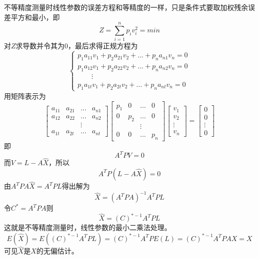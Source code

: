 \begin{enumerate}
	\qquad 不等精度测量时线性参数的误差方程和等精度的一样，只是条件式要取加权残余误差平方和最小，即\begin{equation} Z=\sum_{i=1}^{n}p_iv_i^2=min \end{equation}
	对$ Z $求导数并令其为0，最后求得正规方程为\begin{equation} \begin{cases}
		p_1a_{11}v_1+p_2a_{21}v_2+...+p_na_{n1}v_n=0\\
		p_1a_{12}v_1+p_2a_{22}v_2+...+p_na_{n2}v_n=0\\
		\qquad \vdots\\
		p_1a_{1t}v_1+p_2a_{2t}v_2+...+p_na_{nt}v_n=0
	\end{cases} \end{equation}
	用矩阵表示为\begin{equation} \begin{bmatrix}
		a_{11}&a_{21}&\dots&a_{n1}\\
		a_{12}&a_{22}&\dots&a_{n2}\\
		& 	 &\vdots\\
		a_{1t}&a_{2t}&\dots&a_{nt}
	\end{bmatrix}\begin{bmatrix}
		p_1	&	0	&	\dots&	0\\
		0	&	p_2	&	\dots&	0\\
		& 	 &\vdots\\
		0	&	0	&	\dots&	p_n
	\end{bmatrix}\begin{bmatrix}
		v_1\\v_2\\\vdots\\v_n
	\end{bmatrix}=\begin{bmatrix}
		0\\0\\\vdots\\0
	\end{bmatrix} \end{equation}
	即\begin{equation} A^TPV=0 \end{equation}
	而$ V=L-A\hat{X} $，所以\begin{equation} A^TP(L-A\hat{X})=0 \end{equation}
	由$ A^TPA\hat{X}=A^TPL $得出解为\begin{equation} \hat{X}=(A^TPA)^{-1}A^TPL \end{equation}
	令$ C^*=A^TPA $则\begin{equation} \hat{X}=(C)^{*-1}A^TPL \end{equation}
	这就是不等精度测量时，线性参数的最小二乘法处理。
	\begin{equation} E(\hat{X})=E((C)^{*-1}A^TPL)=(C)^{*-1}A^TPE(L)=(C)^{*-1}A^TPAX=X \end{equation}
	可见$ \hat{X} $是$ X $的无偏估计。
\end{enumerate}
